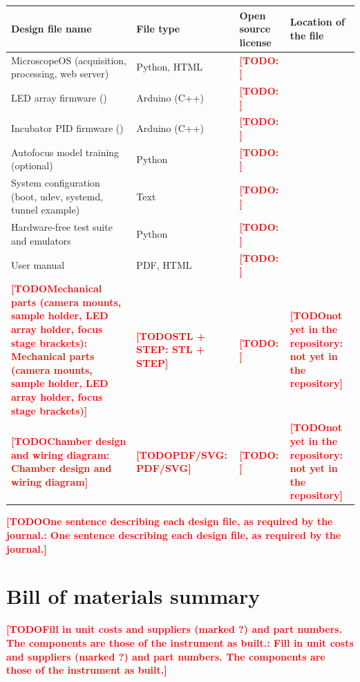 \documentclass[preprint,12pt]{elsarticle}
\DeclareRobustCommand{\TODO}[1]{\textcolor{red}{\textbf{[TODO\ifx\relax#1\relax\else: #1\fi]}}}
\begin{document}
\noindent
\begin{tabularx}{\textwidth}{>{\raggedright\arraybackslash}p{}
  >{\raggedright\arraybackslash}p{}
  >{\raggedright\arraybackslash}p{}L}
\toprule
Design file name & File type & Open source license & Location of the file \\
\midrule
MicroscopeOS (acquisition, processing, web server) & Python, HTML &
  \TODO{} &  \\
LED array firmware () & Arduino (C++) &
  \TODO{} &  \\
Incubator PID firmware () &
  Arduino (C++) & \TODO{} &
   \\
Autofocus model training (optional) & Python & \TODO{} &
   \\
System configuration (boot, udev, systemd, tunnel example) & Text &
  \TODO{} &  \\
Hardware-free test suite and emulators & Python & \TODO{} &
   \\
User manual & PDF, HTML & \TODO{} &  \\
\TODO{Mechanical parts (camera mounts, sample holder, LED array holder,
  focus stage brackets)} & \TODO{STL + STEP} & \TODO{} &
  \TODO{not yet in the repository} \\
\TODO{Chamber design and wiring diagram} & \TODO{PDF/SVG} & \TODO{}
  & \TODO{not yet in the repository} \\
\bottomrule
\end{tabularx}

\medskip\noindent
\TODO{One sentence describing each design file, as required by the
journal.}

\section{Bill of materials summary}

\noindent\TODO{Fill in unit costs and suppliers (marked ?) and part numbers. The components are those of the instrument as built.}
\medskip
\end{document}
